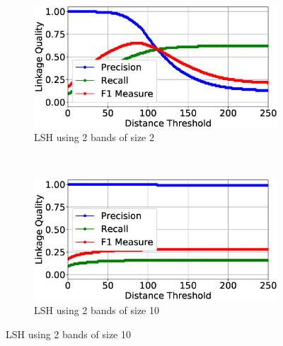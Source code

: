 \documentclass{llncs}
\begin{document}
\begin{figure}
\begin{subfigure}{.47\textwidth}
  \centering
\includegraphics[width=\textwidth]{figures/plotLQ-cora-lsh-2-2}
\vspace{-6mm}
\caption{LSH using 2 bands of size 2}
\end{subfigure}%
~~
\begin{subfigure}{.47\textwidth}
  \centering
\includegraphics[width=\textwidth]{figures/plotLQ-cora-lsh-2-10}
\vspace{-6mm}
\caption{LSH using 2 bands of size 10}
\end{subfigure} \vspace{3mm}


\end{figure}
\end{document}
